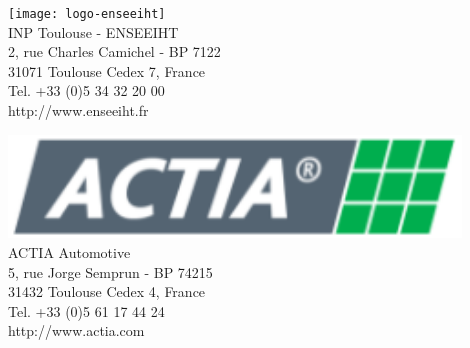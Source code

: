 \documentclass[a4paper,12pt,openany]{book}
\theoremstyle{break}
\begin{document}
\vspace*{\fill}
\begin{center}
\noindent
\begin{minipage}{0.5\textwidth}
  \begin{flushleft} \large
    \texttt{[image: logo-enseeiht]}\\[0.5cm]
    INP Toulouse - ENSEEIHT\\
    2, rue Charles Camichel - BP 7122\\
    31071 Toulouse Cedex 7, France\\
    Tel. +33 (0)5 34 32 20 00\\
    http://www.enseeiht.fr
  \end{flushleft}
\end{minipage}%
\vspace*{\fill}
\begin{minipage}{0.5\textwidth}
  \begin{flushleft} \large
    \includegraphics[width=0.90\textwidth]{logo-actia}\\[0.5cm]
    ACTIA Automotive\\
    5, rue Jorge Semprun - BP 74215\\
    31432 Toulouse Cedex 4, France\\
    Tel. +33 (0)5 61 17 44 24\\
    http://www.actia.com
  \end{flushleft}
\end{minipage}

\end{center}
\vspace*{\fill}
    
\end{document}
